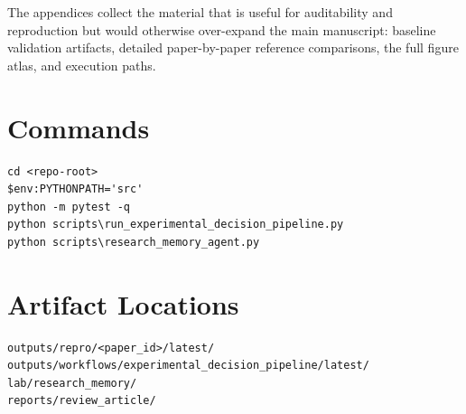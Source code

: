 \documentclass[11pt,a4paper]{article}
\begin{document}
The appendices collect the material that is useful for auditability and
reproduction but would otherwise over-expand the main manuscript: baseline
validation artifacts, detailed paper-by-paper reference comparisons, the full
figure atlas, and execution paths.

\section{Commands}

\begin{verbatim}
cd <repo-root>
$env:PYTHONPATH='src'
python -m pytest -q
python scripts\run_experimental_decision_pipeline.py
python scripts\research_memory_agent.py
\end{verbatim}

\section{Artifact Locations}

\begin{verbatim}
outputs/repro/<paper_id>/latest/
outputs/workflows/experimental_decision_pipeline/latest/
lab/research_memory/
reports/review_article/
\end{verbatim}









\end{document}
